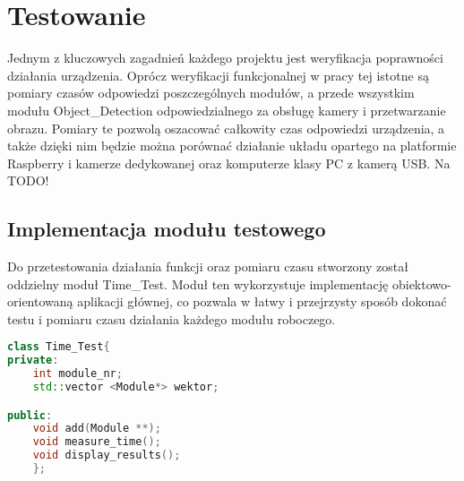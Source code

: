 \chapter{Testowanie} %

Jednym z kluczowych zagadnień każdego projektu jest weryfikacja poprawności działania urządzenia. Oprócz weryfikacji funkcjonalnej w pracy tej istotne są pomiary czasów odpowiedzi poszczególnych modułów, a przede wszystkim modułu Object\_Detection odpowiedzialnego za obsługę kamery i przetwarzanie obrazu. Pomiary te pozwolą oszacować całkowity czas odpowiedzi urządzenia, a także dzięki nim będzie można porównać działanie układu opartego na platformie Raspberry i kamerze dedykowanej oraz komputerze klasy PC z kamerą USB.
Na TODO!

\section{Implementacja modułu testowego}
Do przetestowania działania funkcji oraz pomiaru czasu  stworzony został oddzielny moduł Time\_Test. Moduł ten wykorzystuje implementację obiektowo-orientowaną aplikacji głównej, co pozwala w łatwy i przejrzysty sposób dokonać testu i pomiaru czasu działania każdego modułu roboczego.

\begin{lstlisting}[caption = {Klasa testująca}, label=TestClass, language=C++]
class Time_Test{
private:
	int module_nr;
	std::vector <Module*> wektor;

public:
	void add(Module **);
	void measure_time();
	void display_results();
	}; 
\end{lstlisting}

